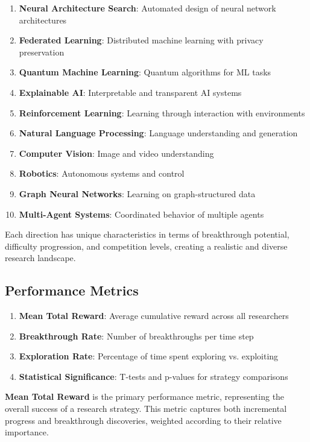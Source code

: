 \documentclass[letterpaper]{article} %
\begin{document}
\begin{enumerate}
\item \textbf{Neural Architecture Search}: Automated design of neural network architectures
\item \textbf{Federated Learning}: Distributed machine learning with privacy preservation
\item \textbf{Quantum Machine Learning}: Quantum algorithms for ML tasks
\item \textbf{Explainable AI}: Interpretable and transparent AI systems
\item \textbf{Reinforcement Learning}: Learning through interaction with environments
\item \textbf{Natural Language Processing}: Language understanding and generation
\item \textbf{Computer Vision}: Image and video understanding
\item \textbf{Robotics}: Autonomous systems and control
\item \textbf{Graph Neural Networks}: Learning on graph-structured data
\item \textbf{Multi-Agent Systems}: Coordinated behavior of multiple agents
\end{enumerate}

Each direction has unique characteristics in terms of breakthrough potential, difficulty progression, and competition levels, creating a realistic and diverse research landscape.

\subsection{Performance Metrics}

\begin{enumerate}
\item \textbf{Mean Total Reward}: Average cumulative reward across all researchers
\item \textbf{Breakthrough Rate}: Number of breakthroughs per time step
\item \textbf{Exploration Rate}: Percentage of time spent exploring vs. exploiting
\item \textbf{Statistical Significance}: T-tests and p-values for strategy comparisons
\end{enumerate}

\textbf{Mean Total Reward} is the primary performance metric, representing the overall success of a research strategy. This metric captures both incremental progress and breakthrough discoveries, weighted according to their relative importance.
\end{document}
